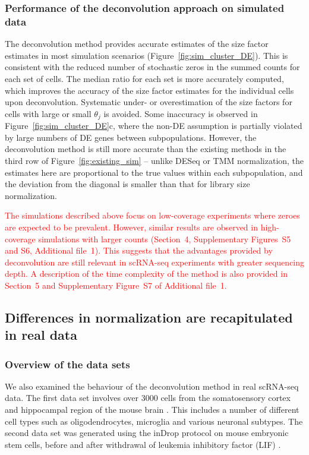 \documentclass{bmcart}
\newcommand{\supphighcov}{4}
\newcommand{\supptimecomp}{5}
\newcommand{\supphighcovex}{S5}
\newcommand{\supphighcovde}{S6}
\newcommand{\supptimings}{S7}
\newcommand{\revised}[1]{\textcolor{red}{#1}}
\begin{document}
\subsubsection*{Performance of the deconvolution approach on simulated data}
The deconvolution method provides accurate estimates of the size factor estimates in most simulation scenarios (Figure~\ref{fig:sim_cluster_DE}).
This is consistent with the reduced number of stochastic zeros in the summed counts for each set of cells.
The median ratio for each set is more accurately computed, which improves the accuracy of the size factor estimates for the individual cells upon deconvolution.
Systematic under- or overestimation of the size factors for cells with large or small $\theta_j$ is avoided.
Some inaccuracy is observed in Figure~\ref{fig:sim_cluster_DE}c, where the non-DE assumption is partially violated by large numbers of DE genes between subpopulations.
However, the deconvolution method is still more accurate than the existing methods in the third row of Figure~\ref{fig:existing_sim}
    -- unlike DESeq or TMM normalization, the estimates here are proportional to the true values within each subpopulation, 
       and the deviation from the diagonal is smaller than that for library size normalization.

\revised{The simulations described above focus on low-coverage experiments where zeroes are expected to be prevalent.
However, similar results are observed in high-coverage simulations with larger counts (Section~\supphighcov{}, Supplementary Figures~\supphighcovex{} and \supphighcovde{}, Additional file~1).
This suggests that the advantages provided by deconvolution are still relevant in scRNA-seq experiments with greater sequencing depth.
A description of the time complexity of the method is also provided in Section~\supptimecomp{} and Supplementary Figure~\supptimings{} of Additional file~1.}

\subsection*{Differences in normalization are recapitulated in real data}

\subsubsection*{Overview of the data sets}
We also examined the behaviour of the deconvolution method in real scRNA-seq data.
The first data set involves over 3000 cells from the somatosensory cortex and hippocampal region of the mouse brain \cite{zeisel2015brain}.
This includes a number of different cell types such as oligodendrocytes, microglia and various neuronal subtypes.
The second data set was generated using the inDrop protocol on mouse embryonic stem cells, before and after withdrawal of leukemia inhibitory factor (LIF) \cite{klein2015droplet}.
\end{document}
